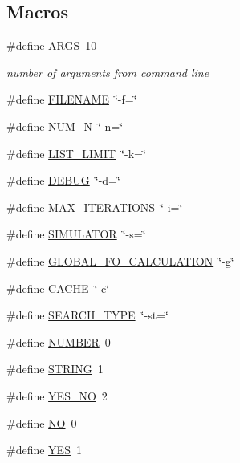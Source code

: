 \subsection*{Macros}
\begin{DoxyCompactItemize}
\item 
\#define \hyperlink{opt__jr__parameters__helper_8hh_aff1b09d6630c6c0942f78171e74c1b9d}{A\-R\-G\-S}~10
\begin{DoxyCompactList}\small\item\em number of arguments from command line \end{DoxyCompactList}\item 
\#define \hyperlink{opt__jr__parameters__helper_8hh_a8de29f7c8bbf1a81cc6e71ac602032d3}{F\-I\-L\-E\-N\-A\-M\-E}~\char`\"{}-\/f=\char`\"{}
\item 
\#define \hyperlink{opt__jr__parameters__helper_8hh_a4f7be859c7225cea6daef529ce8b737a}{N\-U\-M\-\_\-\-N}~\char`\"{}-\/n=\char`\"{}
\item 
\#define \hyperlink{opt__jr__parameters__helper_8hh_aaf0b4413f90241f1be4ff1235595706f}{L\-I\-S\-T\-\_\-\-L\-I\-M\-I\-T}~\char`\"{}-\/k=\char`\"{}
\item 
\#define \hyperlink{opt__jr__parameters__helper_8hh_ad72dbcf6d0153db1b8d8a58001feed83}{D\-E\-B\-U\-G}~\char`\"{}-\/d=\char`\"{}
\item 
\#define \hyperlink{opt__jr__parameters__helper_8hh_a0a3abbca80bc98e7abcb3ae73abe0f14}{M\-A\-X\-\_\-\-I\-T\-E\-R\-A\-T\-I\-O\-N\-S}~\char`\"{}-\/i=\char`\"{}
\item 
\#define \hyperlink{opt__jr__parameters__helper_8hh_ad8a5d8c4e3342fb668142df792e93f38}{S\-I\-M\-U\-L\-A\-T\-O\-R}~\char`\"{}-\/s=\char`\"{}
\item 
\#define \hyperlink{opt__jr__parameters__helper_8hh_a48549690ff4f612c62edddb87aacc438}{G\-L\-O\-B\-A\-L\-\_\-\-F\-O\-\_\-\-C\-A\-L\-C\-U\-L\-A\-T\-I\-O\-N}~\char`\"{}-\/g\char`\"{}
\item 
\#define \hyperlink{opt__jr__parameters__helper_8hh_a43fd55aa78bd891ebbd6a450f5eecce4}{C\-A\-C\-H\-E}~\char`\"{}-\/c\char`\"{}
\item 
\#define \hyperlink{opt__jr__parameters__helper_8hh_a29f84654cbf6a3432582ca010e00f097}{S\-E\-A\-R\-C\-H\-\_\-\-T\-Y\-P\-E}~\char`\"{}-\/st=\char`\"{}
\item 
\#define \hyperlink{opt__jr__parameters__helper_8hh_abc544a4ed22112e62773c113652c5063}{N\-U\-M\-B\-E\-R}~0
\item 
\#define \hyperlink{opt__jr__parameters__helper_8hh_a0f4d394a3ab4e09bff60f714c66dc5ee}{S\-T\-R\-I\-N\-G}~1
\item 
\#define \hyperlink{opt__jr__parameters__helper_8hh_a0966d7215d44b0eb30c4082965114e45}{Y\-E\-S\-\_\-\-N\-O}~2
\item 
\#define \hyperlink{opt__jr__parameters__helper_8hh_a996bde01ecac342918f0a2c4e7ce7bd5}{N\-O}~0
\item 
\#define \hyperlink{opt__jr__parameters__helper_8hh_a7ebc9a785e5ab85457c98595aac81589}{Y\-E\-S}~1
\end{DoxyCompactItemize}
